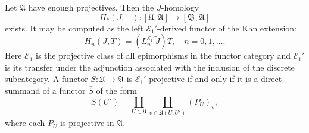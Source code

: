 Let $\mathfrak{A}$ have enough projectives. Then the $J$-homology
$$
H_*(J, -): [\mathfrak{U}, \mathfrak{A}] \rightarrow [\mathfrak{B}, \mathfrak{A}]
$$
exists. It may be computed as the left $\mathcal{E}_1'$-derived functor of the Kan extension:
$$
H_n(J, T) = (L_n^{\mathcal{E}_1'} \tilde{J}) T, \quad n = 0, 1, \dots.
$$
Here $\mathcal{E}_1$ is the projective class of all epimorphisms in the functor category and $\mathcal{E}_1'$ is its transfer under the adjunction associated with the inclusion of the discrete subcategory. A functor $S: \mathfrak{U} \rightarrow \mathfrak{A}$ is $\mathcal{E}_1'$-projective if and only if it is a direct summand of a functor $\bar{S}$ of the form
$$
\bar{S}(U') = \coprod_{U \in \mathfrak{U}} \coprod_{v \in \mathfrak{U}(U, U')} (P_U)_v,
$$
where each $P_U$ is projective in $\mathfrak{A}$.
